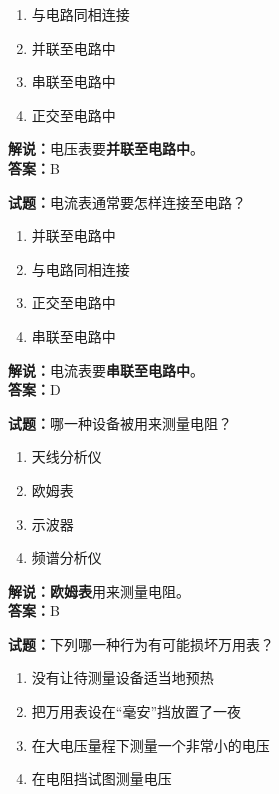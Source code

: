 \documentclass{ctexbook}
\begin{document}
\begin{enumerate}[leftmargin=3em]
	\item 与电路同相连接
	\item 并联至电路中
	\item 串联至电路中
	\item 正交至电路中
\end{enumerate}

\noindent\textbf{解说：}电压表要\textbf{并联至电路中}。\\\noindent\textbf{答案：}B

\bigskip


\noindent\textbf{试题：}电流表通常要怎样连接至电路？

\begin{enumerate}[leftmargin=3em]
	\item 并联至电路中
	\item 与电路同相连接
	\item 正交至电路中
	\item 串联至电路中
\end{enumerate}

\noindent\textbf{解说：}电流表要\textbf{串联至电路中}。\\\noindent\textbf{答案：}D


\bigskip


\noindent\textbf{试题：}哪一种设备被用来测量电阻？

\begin{enumerate}[leftmargin=3em]
	\item 天线分析仪
	\item 欧姆表
	\item 示波器
	\item 频谱分析仪
\end{enumerate}

\noindent\textbf{解说：欧姆表}用来测量电阻。\\\noindent\textbf{答案：}B


\bigskip


\noindent\textbf{试题：}下列哪一种行为有可能损坏万用表？

\begin{enumerate}[leftmargin=3em]
	\item 没有让待测量设备适当地预热
	\item 把万用表设在“毫安”挡放置了一夜
	\item 在大电压量程下测量一个非常小的电压
	\item 在电阻挡试图测量电压
\end{enumerate}
\end{document}
